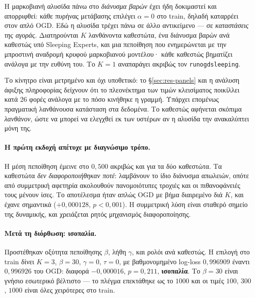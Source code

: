 \documentclass[12pt,a4paper,oneside]{report}
\newcommand{\file}[1]{\texttt{#1}}
\renewcommand{\_}{\oldunderscore\allowbreak}
\theoremstyle{definition}
\theoremstyle{plain}
\theoremstyle{remark}
\begin{document}
Η μαρκοβιανή αλυσίδα πάνω στο \emph{διάνυσμα βαρών} έχει ήδη δοκιμαστεί και απορριφθεί: κάθε
πυρήνας μετάβασης επιλέγει $\alpha=0$ στο train, δηλαδή καταρρέει στον απλό OGD. Εδώ η
αλυσίδα τρέχει πάνω σε άλλο αντικείμενο --- σε \emph{καταστάσεις της αγοράς}. Διατηρούνται
$K$ λανθάνοντα καθεστώτα, ένα διάνυσμα βαρών ανά καθεστώς υπό Sleeping Experts, και μια
πεποίθηση που ενημερώνεται με την μπροστινή αναδρομή κρυφού μαρκοβιανού μοντέλου· κάθε
καθεστώς βηματίζει ανάλογα με την ευθύνη του. Το $K=1$ αναπαράγει ακριβώς τον
\file{run\_ogd\_sleeping}.

Το κίνητρο είναι μετρημένο και όχι υποθετικό: το \S\ref{sec:res-panels} και η ανάλυση άφιξης
πληροφορίας δείχνουν ότι το πλεονέκτημα των τιμών κλεισίματος ποικίλλει κατά 26 φορές
ανάλογα με το πόσο κινήθηκε η γραμμή. Υπάρχει επομένως πραγματική λανθάνουσα κατάσταση στα
δεδομένα. Το καθεστώς αφήνεται σκόπιμα \emph{λανθάνον}, ώστε να μπορεί να ελεγχθεί εκ των
υστέρων αν η αλυσίδα την ανακαλύπτει μόνη της.

\paragraph{Η πρώτη εκδοχή απέτυχε με διαγνώσιμο τρόπο.} Η μέση πεποίθηση έμεινε στο
$0{,}500$ ακριβώς και για τα δύο καθεστώτα. Τα καθεστώτα \emph{δεν διαφοροποιήθηκαν ποτέ}:
λαμβάνουν το ίδιο διάνυσμα απωλειών, οπότε από συμμετρική αφετηρία ακολουθούν πανομοιότυπες
τροχιές και οι πιθανοφάνειές τους μένουν ίσες. Το αποτέλεσμα ήταν απλώς OGD με βήμα
διαιρεμένο διά $K$, και έχανε σημαντικά ($+0{,}000128$, $p<0{,}001$). Η συμμετρική λύση είναι
σταθερό σημείο της δυναμικής, και χρειάζεται ρητός μηχανισμός διαφοροποίησης.

\paragraph{Μετά τη διόρθωση: ισοπαλία.} Προστέθηκαν οξύτητα πεποίθησης $\beta$, λήθη
$\gamma$, και ρολόι ανά καθεστώς. Η επιλογή στο train δίνει $K=3$, $\beta=30$, $\gamma=0$,
$\tau=0$, με βαθμονομημένο log-loss $0{,}996909$ έναντι $0{,}996926$ του OGD: διαφορά
$-0{,}000016$, $p=0{,}211$, \textbf{ισοπαλία}. Το $\beta=30$ είναι γνήσιο εσωτερικό βέλτιστο
--- το πλέγμα επεκτάθηκε ως το $1000$ και οι τιμές $100$, $300$, $1000$ είναι όλες χειρότερες
στο train.
\end{document}
